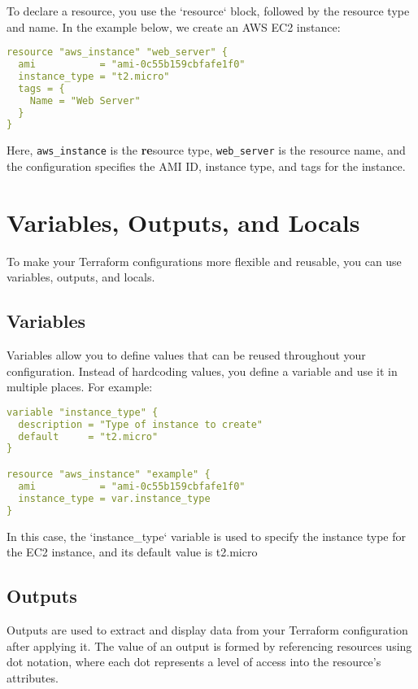 To declare a resource, you use the `resource` block, followed by the resource type and name. In the example below, we create an AWS EC2 instance:

\begin{lstlisting}[language=yaml]
resource "aws_instance" "web_server" {
  ami           = "ami-0c55b159cbfafe1f0"
  instance_type = "t2.micro"
  tags = {
    Name = "Web Server"
  }
}
\end{lstlisting}

Here, \texttt{aws\_instance} is the \textbf{re}source type, \texttt{web\_server} is the resource name, and the configuration specifies the AMI ID, instance type, and tags for the instance.

\section{Variables, Outputs, and Locals}

To make your Terraform configurations more flexible and reusable, you can use variables, outputs, and locals.

\subsection{Variables}

Variables allow you to define values that can be reused throughout your configuration. Instead of hardcoding values, you define a variable and use it in multiple places. For example:

\begin{lstlisting}[language=yaml]
variable "instance_type" {
  description = "Type of instance to create"
  default     = "t2.micro"
}

resource "aws_instance" "example" {
  ami           = "ami-0c55b159cbfafe1f0"
  instance_type = var.instance_type
}
\end{lstlisting}

In this case, the `instance\_type` variable is used to specify the instance type for the EC2 instance, and its default value is t2.micro

\subsection{Outputs}

Outputs are used to extract and display data from your Terraform configuration after applying it. The value of an output is formed by referencing resources using dot notation, where each dot represents a level of access into the resource's attributes.

